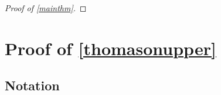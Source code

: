 \documentclass{article}
\newcommand{\eps}{\varepsilon}
\newcommand{\s}[1]{\left(#1\right)}
\DeclareMathOperator{\had}{h}
\begin{document}
\begin{proof}[Proof of \cref{mainthm}]


\end{proof}


%
%
\printbibliography


\newpage

\appendix
{}
\renewcommand{\thethm}{\Alph{section}.\arabic{thm}}

\section{Proof of \cref{thomasonupper}}

\subsection{Notation}
\end{document}
